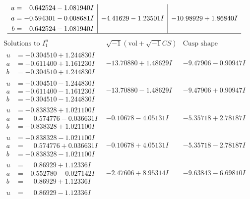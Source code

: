 \documentclass[1p]{elsarticle_modified}
\theoremstyle{definition}
\newcommand{\I}{\sqrt{-1}}
\begin{document}
$$\begin{array}{c|c|c}
\begin{aligned}
u &= \phantom{-}0.642524 - 1.081940 I \\
a &= -0.594301 - 0.008681 I \\
b &= \phantom{-}0.642524 - 1.081940 I\end{aligned}
 & -4.41629 - 1.23501 I & -10.98929 + 1.86840 I\\
 \hline 
 \end{array}$$\newpage$$\begin{array}{c|c|c}  
\text{Solutions to }I^u_{1}& \I (\text{vol} + \sqrt{-1}CS) & \text{Cusp shape}\\
 \hline 
\begin{aligned}
u &= -0.304510 + 1.244830 I \\
a &= -0.611400 + 1.161230 I \\
b &= -0.304510 + 1.244830 I\end{aligned}
 & -13.70880 + 1.48629 I & -9.47906 - 0.90947 I \\ \hline\begin{aligned}
u &= -0.304510 - 1.244830 I \\
a &= -0.611400 - 1.161230 I \\
b &= -0.304510 - 1.244830 I\end{aligned}
 & -13.70880 - 1.48629 I & -9.47906 + 0.90947 I \\ \hline\begin{aligned}
u &= -0.838328 + 1.021100 I \\
a &= \phantom{-}0.574776 - 0.036631 I \\
b &= -0.838328 + 1.021100 I\end{aligned}
 & -0.10678 - 4.05131 I & -5.35718 + 2.78187 I \\ \hline\begin{aligned}
u &= -0.838328 - 1.021100 I \\
a &= \phantom{-}0.574776 + 0.036631 I \\
b &= -0.838328 - 1.021100 I\end{aligned}
 & -0.10678 + 4.05131 I & -5.35718 - 2.78187 I \\ \hline\begin{aligned}
u &= \phantom{-}0.86929 + 1.12336 I \\
a &= -0.552780 - 0.027142 I \\
b &= \phantom{-}0.86929 + 1.12336 I\end{aligned}
 & -2.47606 + 8.95314 I & -9.63843 - 6.69810 I \\ \hline\begin{aligned}
u &= \phantom{-}0.86929 - 1.12336 I \\

\end{aligned}
\end{array}$$
\end{document}
